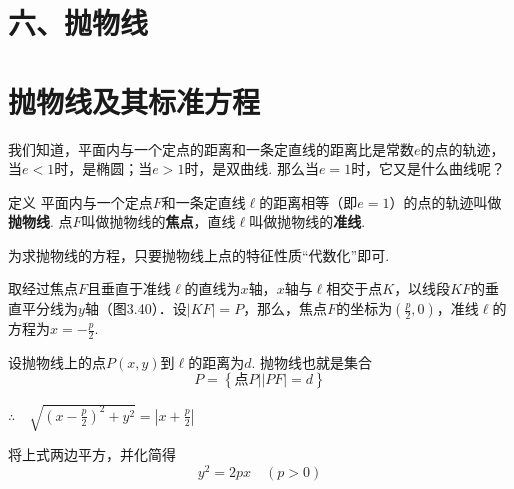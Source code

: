 \section*{六、抛物线}
\section{抛物线及其标准方程}
我们知道，平面内与一个定点的距离和一条定直线的距离比是常数$e$的点的轨迹，当$e<1$时，是椭圆；当$e>1$时，是双曲线. 那么当$e=1$时，它又是什么曲线呢？

\begin{thm}
   {定义} 平面内与一个定点$F$和一条定直线$\ell$的距离相等（即$e=1$）的点的轨迹叫做\textbf{抛物线}. 点$F$叫做抛物线的\textbf{焦点}，直线$\ell$叫做抛物线的\textbf{准线}.
\end{thm}

为求抛物线的方程，只要抛物线上点的特征性质“代数化”即可.

\noindent
\begin{minipage}{.6\textwidth}\CTEXindent
    取经过焦点$F$且垂直于准线$\ell$的直线为$x$轴，$x$轴与$\ell$相交于点$K$，以线段$KF$的垂直平分线为$y$轴（图3.40）．设$|KF|=P$，那么，焦点$F$的坐标为$\left(\frac{p}{2},0\right)$，准线$\ell$的方程为$x=-\frac{p}{2}$.

    设抛物线上的点$P(x,y)$到$\ell$的距离为$d$. 抛物线也就是集合
    \[P=\left\{\text{点}P\Big||PF|=d \right\}\]
    
    $\therefore\quad \sqrt{\left(x-\frac{p}{2}\right)^2+y^2}=\left|x+\frac{p}{2}\right|$
\end{minipage}
\hfill
\begin{minipage}{.37\textwidth}
\centering
{}
\end{minipage}


将上式两边平方，并化简得
\begin{equation}
    y^2=2px\quad (p>0) \tag{1}
\end{equation}

